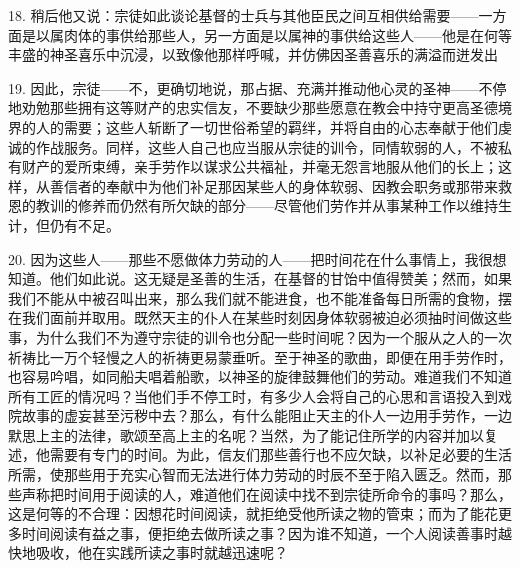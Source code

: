 18. 稍后他又说：宗徒如此谈论基督的士兵与其他臣民之间互相供给需要——一方面是以属肉体的事供给那些人，另一方面是以属神的事供给这些人——他是在何等丰盛的神圣喜乐中沉浸，以致像他那样呼喊，并仿佛因圣善喜乐的满溢而迸发出\par

19. 因此，宗徒——不，更确切地说，那占据、充满并推动他心灵的圣神——不停地劝勉那些拥有这等财产的忠实信友，不要缺少那些愿意在教会中持守更高圣德境界的人的需要；这些人斩断了一切世俗希望的羁绊，并将自由的心志奉献于他们虔诚的作战服务。同样，这些人自己也应当服从宗徒的训令，同情软弱的人，不被私有财产的爱所束缚，亲手劳作以谋求公共福祉，并毫无怨言地服从他们的长上；这样，从善信者的奉献中为他们补足那因某些人的身体软弱、因教会职务或那带来救恩的教训的修养而仍然有所欠缺的部分——尽管他们劳作并从事某种工作以维持生计，但仍有不足。\par

20. 因为这些人——那些不愿做体力劳动的人——把时间花在什么事情上，我很想知道。他们如此说。这无疑是圣善的生活，在基督的甘饴中值得赞美；然而，如果我们不能从中被召叫出来，那么我们就不能进食，也不能准备每日所需的食物，摆在我们面前并取用。既然天主的仆人在某些时刻因身体软弱被迫必须抽时间做这些事，为什么我们不为遵守宗徒的训令也分配一些时间呢？因为一个服从之人的一次祈祷比一万个轻慢之人的祈祷更易蒙垂听。至于神圣的歌曲，即便在用手劳作时，也容易吟唱，如同船夫唱着船歌，以神圣的旋律鼓舞他们的劳动。难道我们不知道所有工匠的情况吗？当他们手不停工时，有多少人会将自己的心思和言语投入到戏院故事的虚妄甚至污秽中去？那么，有什么能阻止天主的仆人一边用手劳作，一边默思上主的法律，歌颂至高上主的名呢？当然，为了能记住所学的内容并加以复述，他需要有专门的时间。为此，信友们那些善行也不应欠缺，以补足必要的生活所需，使那些用于充实心智而无法进行体力劳动的时辰不至于陷入匮乏。然而，那些声称把时间用于阅读的人，难道他们在阅读中找不到宗徒所命令的事吗？那么，这是何等的不合理：因想花时间阅读，就拒绝受他所读之物的管束；而为了能花更多时间阅读有益之事，便拒绝去做所读之事？因为谁不知道，一个人阅读善事时越快地吸收，他在实践所读之事时就越迅速呢？\par

